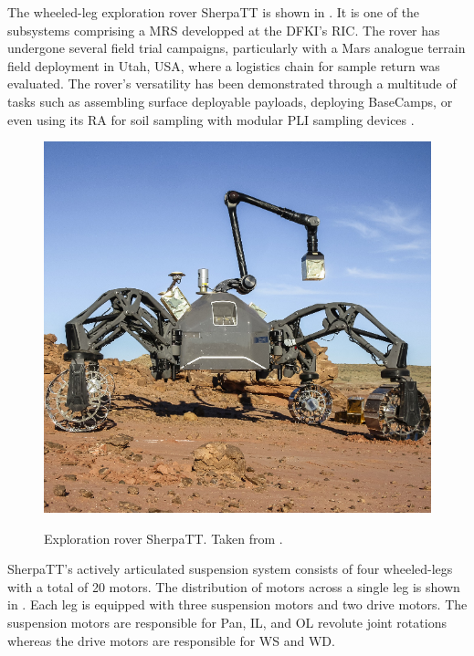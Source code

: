 The wheeled-leg exploration rover SherpaTT is shown in . It is one of the subsystems comprising a \ac{MRS} developped at the \ac{DFKI}'s \ac{RIC}. The rover has undergone several field trial campaigns, particularly with a Mars analogue terrain field deployment  in Utah, USA, where a logistics chain for sample return was evaluated. The rover's versatility has been demonstrated through a multitude of tasks such as assembling surface deployable payloads, deploying BaseCamps, or even using its \ac{RA} for soil sampling with modular \ac{PLI} sampling devices .

\begin{figure}[h]
  \centering
  \hypersetup{linkcolor=captionTextColor}
  \includegraphics[width=0.6\linewidth]{sections/introduction/background/images/sherpa-tt.png}\\
  \caption[Exploration rover SherpaTT]
          {Exploration rover SherpaTT. Taken from .}
  \label{fig:sherpatt}
\end{figure}


SherpaTT's actively articulated suspension system consists of four wheeled-legs with a total of 20 motors. The distribution of motors across a single leg is shown in . Each leg is equipped with three suspension motors and two drive motors. The suspension motors are responsible for Pan, \ac{IL}, and \ac{OL} revolute joint rotations whereas the drive motors are responsible for \ac{WS} and \ac{WD}. 


